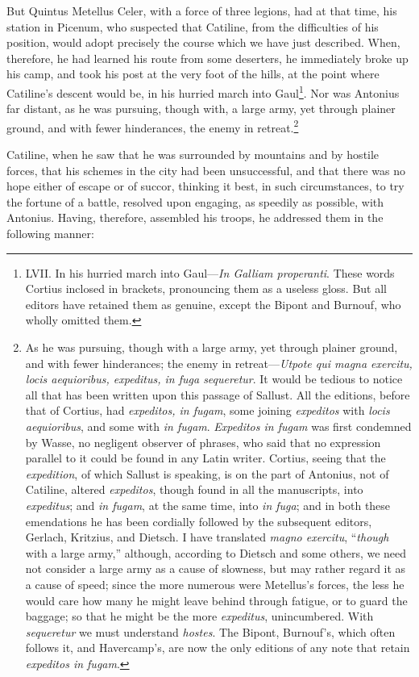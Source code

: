 But Quintus Metellus Celer, with a force of three legions, had at that
time, his station in Picenum, who suspected that Catiline, from the
difficulties of his position, would adopt precisely the course which
we have just described. When, therefore, he had learned his route from
some deserters, he immediately broke up his camp, and took his post at
the very foot of the hills, at the point where Catiline's descent
would be, in his hurried march into Gaul\footnote{LVII. In his hurried march into Gaul—\emph{In Galliam properanti}.
These words Cortius inclosed in brackets, pronouncing them as a useless
gloss. But all editors have retained them as genuine, except the Bipont
and Burnouf, who wholly omitted them.}. Nor was Antonius far
distant, as he was pursuing, though with, a large army, yet through
plainer ground, and with fewer hinderances, the enemy in retreat.\footnote{As he was pursuing, though with a large army, yet through
plainer ground, and with fewer hinderances; the enemy in
retreat—\emph{Utpote qui magna exercitu, locis aequioribus, expeditus, in
fuga sequeretur}. It would be tedious to notice all that has been
written upon this passage of Sallust. All the editions, before that of
Cortius, had \emph{expeditos, in fugam}, some joining \emph{expeditos} with
\emph{locis aequioribus}, and some with \emph{in fugam}. \emph{Expeditos in fugam}
was first condemned by Wasse, no negligent observer of phrases, who
said that no expression parallel to it could be found in any Latin
writer. Cortius, seeing that the \emph{expedition}, of which Sallust is
speaking, is on the part of Antonius, not of Catiline, altered
\emph{expeditos}, though found in all the manuscripts, into \emph{expeditus};
and \emph{in fugam}, at the same time, into \emph{in fuga}; and in both these
emendations he has been cordially followed by the subsequent editors,
Gerlach, Kritzius, and Dietsch. I have translated \emph{magno exercitu},
``\emph{though} with a large army,'' although, according to Dietsch and some
others, we need not consider a large army as a cause of slowness, but
may rather regard it as a cause of speed; since the more numerous were
Metellus's forces, the less he would care how many he might leave
behind through fatigue, or to guard the baggage; so that he might be
the more \emph{expeditus}, unincumbered. With \emph{sequeretur} we must
understand \emph{hostes}. The Bipont, Burnouf's, which often follows it,
and Havercamp's, are now the only editions of any note that retain
\emph{expeditos in fugam}.}

Catiline, when he saw that he was surrounded by mountains and by
hostile forces, that his schemes in the city had been unsuccessful,
and that there was no hope either of escape or of succor, thinking it
best, in such circumstances, to try the fortune of a battle, resolved
upon engaging, as speedily as possible, with Antonius. Having,
therefore, assembled his troops, he addressed them in the following
manner:

